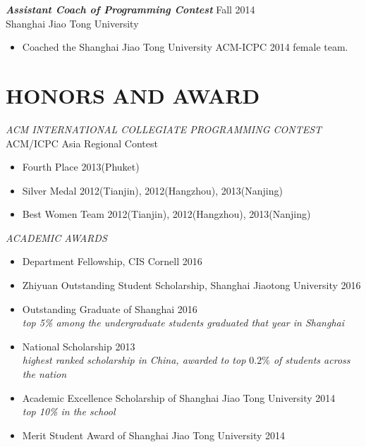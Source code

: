 \documentclass[margin, 10pt]{res} %
\begin{document}
\begin{resume}
{\sl \textbf{Assistant Coach of Programming Contest}} \hfill Fall 2014 \\
Shanghai Jiao Tong University
\begin{itemize}
\item Coached the Shanghai Jiao Tong University ACM-ICPC 2014 female team.
\end{itemize}



 
\section{HONORS AND AWARD}

{\sl ACM INTERNATIONAL COLLEGIATE PROGRAMMING CONTEST} \\
ACM/ICPC Asia Regional Contest 

\begin{itemize} \itemsep -2pt %
\item Fourth Place \hfill 2013(Phuket)
\item Silver Medal \hfill 2012(Tianjin), 2012(Hangzhou), 2013(Nanjing) 
\item Best Women Team \hfill 2012(Tianjin), 2012(Hangzhou), 2013(Nanjing) 
\end{itemize}
 
{\sl ACADEMIC AWARDS}\\
\begin{itemize}
\item Department Fellowship, CIS Cornell \hfill 2016
\item Zhiyuan Outstanding Student Scholarship, Shanghai Jiaotong University \hfill 2016
\item Outstanding Graduate of Shanghai \hfill 2016\\
\emph{top 5\% among the undergraduate students graduated that year in Shanghai}
\item National Scholarship \hfill 2013 \\ 
\emph{highest ranked scholarship in China, awarded to top $0.2\%$ of students across
the nation}
\item Academic Excellence Scholarship of Shanghai Jiao Tong
  University \hfill 2014 \\
  \emph{top 10\% in the school}
\item Merit Student Award of Shanghai Jiao Tong University \hfill 2014
\end{itemize}


\end{resume}
\end{document}
